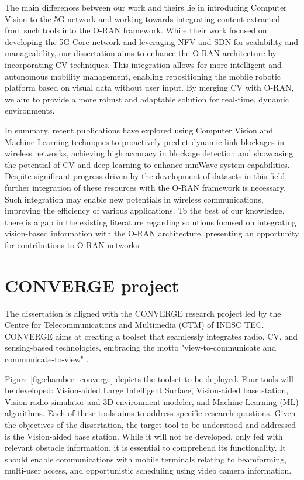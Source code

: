The main differences between our work and theirs lie in introducing Computer Vision to the 5G network and working towards integrating content extracted from such tools into the O-RAN framework. While their work focused on developing the 5G Core network and leveraging NFV and SDN for scalability and manageability, our dissertation aims to enhance the O-RAN architecture by incorporating CV techniques. This integration allows for more intelligent and autonomous mobility management, enabling repositioning the mobile robotic platform based on visual data without user input. By merging CV with O-RAN, we aim to provide a more robust and adaptable solution for real-time, dynamic environments.


In summary, recent publications have explored using Computer Vision and Machine Learning techniques to proactively predict dynamic link blockages in wireless networks, achieving high accuracy in blockage detection and showcasing the potential of CV and deep learning to enhance mmWave system capabilities. Despite significant progress driven by the development of datasets in this field, further integration of these resources with the O-RAN framework is necessary. Such integration may enable new potentials in wireless communications, improving the efficiency of various applications. To the best of our knowledge, there is a gap in the existing literature regarding solutions focused on integrating vision-based information with the O-RAN architecture, presenting an opportunity for contributions to O-RAN networks.



\section{CONVERGE project}\label{sec:CONVERGE}

The dissertation is aligned with the CONVERGE research project led by the Centre for
Telecommunications and Multimedia (CTM) of INESC TEC. CONVERGE aims at creating a
toolset that seamlessly integrates radio, CV, and sensing-based technologies,
embracing the motto "view-to-communicate and communicate-to-view" \cite{converge_site}.

Figure \ref{fig:chamber_converge} depicts the toolset to be deployed. Four tools will be developed: Vision-aided Large Intelligent Surface, Vision-aided base station, Vision-radio simulator and 3D environment modeler, and Machine Learning (ML) algorithms. Each of these tools aims to address specific research questions. Given the objectives of the dissertation, the target tool to be understood and addressed is the Vision-aided base station. While it will not be developed, only fed with relevant obstacle information, it is essential to comprehend its functionality. It should enable communications with mobile terminals relating to beamforming, multi-user access, and opportunistic scheduling using video camera information. 

